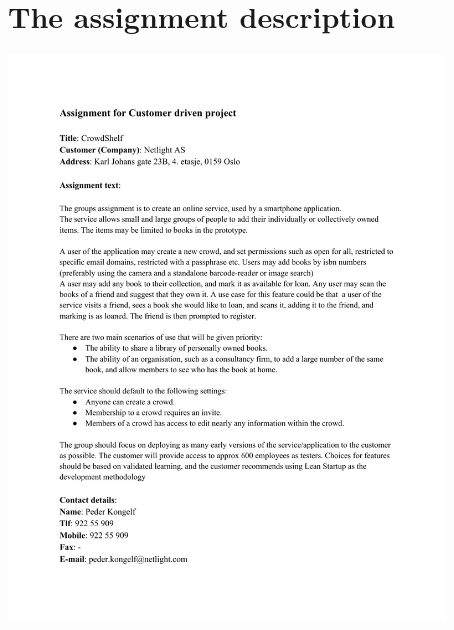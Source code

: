 \chapter{The assignment description}
\label{app:assignment-description}
\includegraphics[trim={2cm 0 2cm 2cm},clip, height = 15cm]{appendices/assignment-description.pdf}

